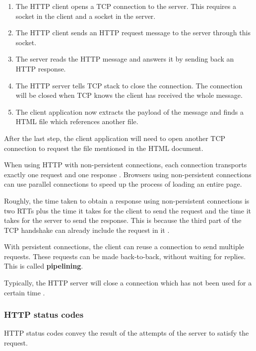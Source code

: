 \begin{enumerate}
\item The HTTP client opens a TCP connection to the server.
This requires a socket in the client and a socket in the server.
\item The HTTP client sends an HTTP request message to the server through this socket.
\item The server reads the HTTP message and answers it by sending back an HTTP response.
\item The HTTP server tells TCP stack to close the connection.
The connection will be closed when TCP knows the client has received the whole message.
\item The client application now extracts the payload of the message and finds a HTML file which references another file.
\end{enumerate}

After the last step, the client application will need to open another TCP connection to request the file mentioned in the HTML document.

When using HTTP with non-persistent connections, each connection transports exactly one request and one response \cite[p.~101]{computer-networking-kurose-2012}.
Browsers using non-persistent connections can use parallel connections to speed up the process of loading an entire page.

Roughly, the time taken to obtain a response using non-persistent connections is two RTTs plus the time it takes for the client to send the request and the time it takes for the server to send the response.
This is because the third part of the TCP handshake can already include the request in it \cite[p.~102]{computer-networking-kurose-2012}.

With persistent connections, the client can reuse a connection to send multiple requests. These requests can be made back-to-back, without waiting for replies.
This is called \textbf{pipelining}.

Typically, the HTTP server will close a connection which has not been used for a certain time \cite[p.~103]{computer-networking-kurose-2012}.

\subsubsection{HTTP status codes}

HTTP status codes convey the result of the attempts of the server to satisfy the request.

